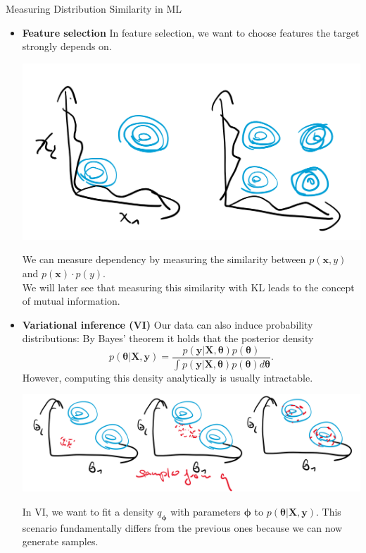 \documentclass[11pt,compress,t,notes=noshow, xcolor=table]{beamer}
\begin{document}
\begin{vbframe} {Measuring Distribution Similarity in ML}
\begin{itemize}
\end{itemize}

\framebreak

\begin{itemize}
    \item \textbf{Feature selection}
In feature selection, we want to choose features the target strongly depends on. 

\includegraphics[width=0.6\linewidth]{figure_man/kl_ml_mi.png}

We can measure dependency by measuring the similarity between $p(\mathbf{x}, y)$ and $p(\mathbf{x})\cdot p(y).$ \\
We will later see that measuring this similarity with KL  leads to the concept of mutual information.

\end{itemize}

\framebreak

\begin{itemize}
    \item \textbf{Variational inference (VI)}
Our data can also induce probability distributions: By Bayes' theorem it holds that the posterior density $$p(\bm{\theta}\vert \mathbf{X}, \mathbf{y}) = \frac{p(\mathbf{y}|\mathbf{X}, \bm{\theta})p(\bm{\theta})}{\int p(\mathbf{y}|\mathbf{X}, \bm{\theta})p(\bm{\theta})d\bm{\theta}}.$$ However, computing this density analytically is usually intractable.

\includegraphics[width=0.99\linewidth]{figure_man/kl_ml_vi.png}

In VI, we want to fit a density $q_{\bm{\phi}}$ with parameters $\bm{\phi}$ to 
    $p(\bm{\theta}\vert \mathbf{X}, \mathbf{y}).$
This scenario fundamentally differs from the previous ones because we can now generate samples.

\end{itemize}

\end{vbframe}
\end{document}
